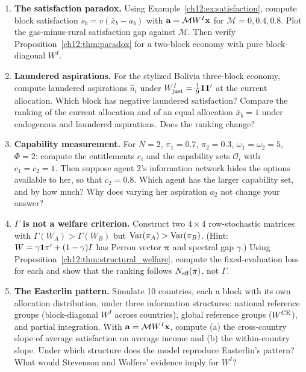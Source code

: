\documentclass[../structural_economics_book.tex]{subfiles}
\begin{document}
\begin{enumerate}[label=\textbf{12.\arabic*}, leftmargin=3em]

\item \textbf{The satisfaction paradox.} Using Example~\ref{ch12:ex:satisfaction}, compute block satisfaction $s_b = v(\bar{x}_b - a_b)$ with $\mathbf{a} = \mathcal{M}W^I\mathbf{x}$ for $\mathcal{M} = 0, 0.4, 0.8$. Plot the gas-minus-rural satisfaction gap against $\mathcal{M}$. Then verify Proposition~\ref{ch12:thm:paradox} for a two-block economy with pure block-diagonal $W^I$.

\item \textbf{Laundered aspirations.} For the stylized Bolivia three-block economy, compute laundered aspirations $\hat{a}_i$ under $W^I_{\text{just}} = \frac{1}{9}\mathbf{1}\mathbf{1}'$ at the current allocation. Which block has negative laundered satisfaction? Compare the ranking of the current allocation and of an equal allocation $\bar{x}_b = 1$ under endogenous and laundered aspirations. Does the ranking change?

\item \textbf{Capability measurement.} For $N = 2$, $\pi_1 = 0.7$, $\pi_2 = 0.3$, $\omega_1 = \omega_2 = 5$, $\Phi = 2$: compute the entitlements $e_i$ and the capability sets $\mathcal{O}_i$ with $c_1 = c_2 = 1$. Then suppose agent 2's information network hides the options available to her, so that $c_2 = 0.8$. Which agent has the larger capability set, and by how much? Why does varying her aspiration $a_2$ not change your answer?

\item \textbf{$\Gamma$ is not a welfare criterion.} Construct two $4 \times 4$ row-stochastic matrices with $\Gamma(W_A) > \Gamma(W_B)$ but $\operatorname{Var}(\pi_A) > \operatorname{Var}(\pi_B)$. (Hint: $W = \gamma\mathbf{1}\pi' + (1-\gamma)I$ has Perron vector $\boldsymbol{\pi}$ and spectral gap $\gamma$.) Using Proposition~\ref{ch12:thm:structural_welfare}, compute the fixed-evaluation loss for each and show that the ranking follows $N_{\text{eff}}(\pi)$, not $\Gamma$.

\item \textbf{The Easterlin pattern.} Simulate 10 countries, each a block with its own allocation distribution, under three information structures: national reference groups (block-diagonal $W^I$ across countries), global reference groups ($W^{\text{CE}}$), and partial integration. With $\mathbf{a} = \mathcal{M}W^I\mathbf{x}$, compute (a) the cross-country slope of average satisfaction on average income and (b) the within-country slope. Under which structure does the model reproduce Easterlin's pattern? What would Stevenson and Wolfers' evidence imply for $W^I$?


\end{enumerate}
\end{document}
